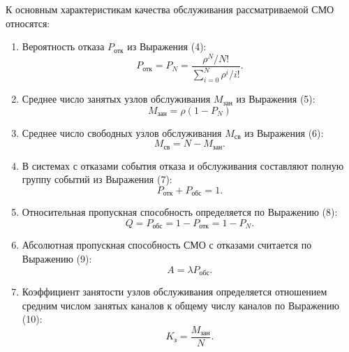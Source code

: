 \documentclass[14pt]{extarticle}
\begin{document}
    К основным характеристикам качества обслуживания рассматриваемой СМО относятся:
    \begin{enumerate}
        \item Вероятность отказа $P_\text{отк}$ из Выражения (4):
        \begin{equation}
            P_\text{отк} = P_N = \frac{\rho^N / N!}{\sum_{i = 0}^N \rho^i / i!}.
        \end{equation}

        \item Среднее число занятых узлов обслуживания $M_\text{зан}$ из Выражения (5):
        \begin{equation}
            M_\text{зан} = \rho (1 - P_N)
        \end{equation}

        \item Среднее число свободных узлов обслуживания $M_\text{св}$ из Выражения (6):
        \begin{equation}
            M_\text{св} = N - M_\text{зан}.
        \end{equation}

        \item В системах с отказами события отказа и обслуживания составляют полную группу событий из Выражения (7):
        \begin{equation}
            P_\text{отк} + P_\text{обс} = 1.
        \end{equation}

        \item Относительная пропускная способность определяется по Выражению (8):
        \begin{equation}
            Q = P_\text{обс} = 1 - P_\text{отк} = 1 - P_N.
        \end{equation}

        \item Абсолютная пропускная способность СМО с отказами считается по Выражению (9):
        \begin{equation}
            A = \lambda P_\text{обс}.
        \end{equation}

        \item Коэффициент занятости узлов обслуживания определяется отношением средним числом занятых каналов к общему числу каналов по Выражению (10):
        \begin{equation}
            K_\text{з} = \frac{M_\text{зан}}{N}.
        \end{equation}
    \end{enumerate}
\end{document}
